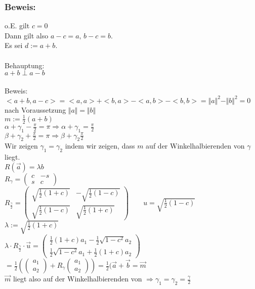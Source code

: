\subsubsection{Beweis:}
o.E. gilt $c=0$\\
Dann gilt also $a-c=a, \, b-c=b$.\\
Es sei $d:=a+b$. \\
\qquad\\
Behauptung:\\
 $a+b\perp a-b$\\
 \qquad\\
Beweis:\\
$<a+b,a-c>=<a,a>+<b,a>-<a,b>-<b,b>=\Vert a \Vert^{2}-\Vert b \Vert^{2} = 0$ nach Voraussetzung $\Vert a \Vert = \Vert b \Vert$\\
%
%
%
%
$m:=\frac{1}{2}(a+b)$\\
$\alpha + \gamma_{1} - \frac{\pi}{2}=\pi \Rightarrow \alpha + \gamma_{1} = \frac{\pi}{2}$\\
$\beta+\gamma_{2}+\frac{\pi}{2}=\pi\Rightarrow\beta+\gamma_{2}\frac{\pi}{2}$\\
Wir zeigen $\gamma_{1}=\gamma_{2}$ indem wir zeigen, dass $m$ auf der Winkelhalbierenden von $\gamma$ liegt. \\
$R(\vec{a})=\lambda b$\\
$R_{\gamma}=\begin{pmatrix} c & -s \\ s & c \end{pmatrix}$\\
$R_{\frac{\gamma}{2}}=\begin{pmatrix} \sqrt{\frac{1}{2} (1+c)} & - \sqrt{\frac{1}{2}(1-c)} \\ \sqrt{\frac{1}{2}(1-c)} & \sqrt{\frac{1}{2}(1+c)}\end{pmatrix} \qquad u=\sqrt{\frac{1}{2}(1-c)}$\\
$\lambda :=\sqrt{\frac{1}{2}(1+c)}$\\
$\lambda \cdot R_{\frac{\gamma}{2}} \cdot \vec{u} = \begin{pmatrix} \frac{1}{2} (1+c)a_{1} -\frac{1}{2}\sqrt{1-c^{2}}a_{2} \\ \frac{1}{2}\sqrt{1-c^{2}}a_{1} + \frac{1}{2}(1+c)a_{2}\end{pmatrix}$\\
$= \frac{1}{2}(\begin{pmatrix}a_{1} \\ a_{2} \end{pmatrix} + R_{\gamma} \begin{pmatrix} a_{1} \\ a_{2} \end{pmatrix} ) = \frac{1}{2}(\vec{a}+\vec{b}=\vec{m}$\\
$\vec{m}$ liegt also auf der Winkelhalbierenden von $\Rightarrow \gamma_{1} = \gamma_{2} = \frac{\gamma}{2}$